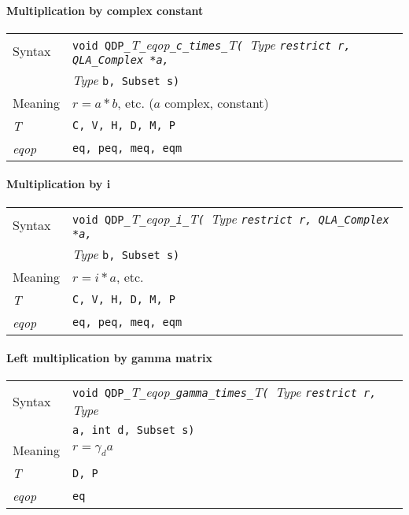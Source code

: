 \documentclass{article}
\newcommand{\tqlaComplex}{QLA\ttdash Complex }
\newcommand{\namespace}{QDP}
\newcommand{\allEqOps}{{\tt eq, peq, meq, eqm}}
\newcommand{\ttdash}{{\tt \_}}
\newcommand{\itt}{\it T}
\newcommand{\extraarg}{, Subset s}
\begin{document}
\paragraph{Multiplication by complex constant}

\begin{flushleft}
  \begin{tabular}{|l|l|}
  \hline
  Syntax      & {\tt void \namespace}\ttdash\itt\ttdash{\it eqop}\ttdash{\tt c}\ttdash{\tt times}\ttdash\itt{\tt ( }{\it Type }{\tt *restrict r, \tqlaComplex *a,}\\
              & {\it Type }{\tt *b\extraarg)} \\
  \hline
  Meaning     & $r = a*b$, etc. ($a$ complex, constant)
$
$\\
  \hline
  \itt     & {\tt C, V, H, D, M, P} \\
  \hline
  {\it eqop}  & \allEqOps \\
  \hline
  \end{tabular}
\end{flushleft}

\paragraph{Multiplication by i}

\begin{flushleft}
  \begin{tabular}{|l|l|}
  \hline
  Syntax      & {\tt void \namespace}\ttdash\itt\ttdash{\it eqop}\ttdash{\tt i}\ttdash\itt{\tt ( }{\it Type }{\tt *restrict r, \tqlaComplex *a,}\\
              & {\it Type }{\tt *b\extraarg)} \\
  \hline
  Meaning     & $r = i*a$, etc.\\
  \hline
  \itt     & {\tt C, V, H, D, M, P} \\
  \hline
  {\it eqop}  & \allEqOps \\
  \hline
  \end{tabular}
\end{flushleft}

\paragraph{Left multiplication by gamma matrix}

\begin{flushleft}
  \begin{tabular}{|l|l|}
  \hline
  Syntax      & {\tt void \namespace}\ttdash\itt\ttdash{\it eqop}\ttdash{\tt gamma}\ttdash{\tt times}\ttdash\itt{\tt ( }{\it Type }{\tt *restrict r, }{\it Type }\\
              & {\tt *a, int d\extraarg)} \\
  \hline
  Meaning     & $r = \gamma_d a$ \\
  \hline
  \itt     & {\tt D, P} \\
  \hline
  {\it eqop}  & {\tt eq} \\
  \hline
  \end{tabular}
\end{flushleft}
\end{document}
